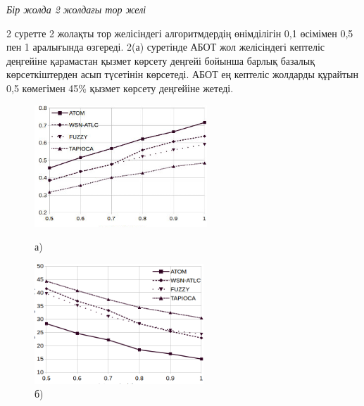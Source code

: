 \begin{multicols}{2}
\emph{Бір жолда 2 жолдағы тор желі}

2 суретте 2 жолақты тор желісіндегі алгоритмдердің өнімділігін 0,1
өсімімен 0,5 пен 1 \hspace{0pt}\hspace{0pt}аралығында өзгереді. 2(а)
суретінде АБОТ жол желісіндегі кептеліс деңгейіне қарамастан қызмет
көрсету деңгейі бойынша барлық базалық көрсеткіштерден асып түсетінін
көрсетеді. АБОТ ең кептеліс жолдарды құрайтын 0,5 көмегімен 45\% қызмет
көрсету деңгейіне жетеді.

\end{multicols}

\begin{figure}[H]
    \centering
    \begin{minipage}{0.45\textwidth}
        \centering
        \includegraphics[width=\textwidth]{assets/159}
        \caption*{а)}
    \end{minipage}
    \hfill
    \begin{minipage}{0.45\textwidth}
        \centering
        \includegraphics[width=\textwidth]{assets/160}
        \caption*{б)}
    \end{minipage}
    

\end{figure}
